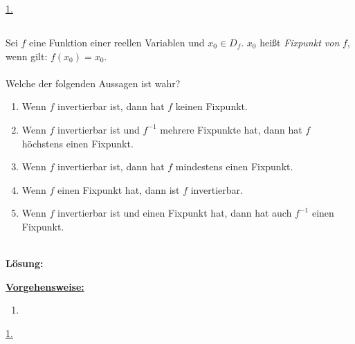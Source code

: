 \underline{1. }\\





\newpage

\subsection*{}
Sei $ f $ eine Funktion einer reellen Variablen und $ x_0 \in D_f $.
$ x_0  $ heißt \textit{Fixpunkt von} $ f $, wenn gilt: $ f(x_0) = x_0 $.\\
\\
Welche der folgenden Aussagen ist wahr? 
\renewcommand{\labelenumi}{(\alph{enumi})}
\begin{enumerate}
	\item 
	Wenn $ f $ invertierbar ist, dann hat $ f $ keinen Fixpunkt.
	\item
	Wenn $ f $ invertierbar ist und $ f^{-1} $ mehrere Fixpunkte hat, dann hat $ f $ höchstens einen Fixpunkt.
	\item
	Wenn $ f $ invertierbar ist, dann hat $ f $ mindestens einen Fixpunkt.
	\item
	Wenn $ f  $ einen Fixpunkt hat, dann ist $ f $ invertierbar.
	\item
	Wenn $ f $ invertierbar ist und einen Fixpunkt hat, dann hat auch $ f^{-1} $ einen Fixpunkt.
\end{enumerate}
\ \\
\textbf{Lösung:}
\begin{mdframed}
\underline{\textbf{Vorgehensweise:}}
\renewcommand{\labelenumi}{\theenumi.}
\begin{enumerate}
\item 
\end{enumerate}
\end{mdframed}

\underline{1. }\\


\newpage
